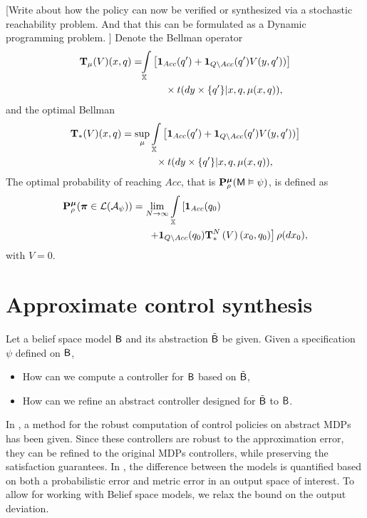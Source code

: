 \documentclass{ifacconf}
\newcommand{\red}[1]{{\color{red} #1}}
\begin{document}
\red{[Write about how the policy can now be verified or synthesized via a stochastic reachability problem. And that this can be formulated as a Dynamic programming problem.  ]}
Denote the Bellman operator
\begin{align}\label{eq:V_recopt_inf}
& \Bel_\pol (V)(x,q) =\!\!\int_{\bar\X}  \left[\mathbf 1_{Acc}(q')+  \mathbf 1_{Q\setminus Acc}( q')V( y, q'))\right]\notag\\&\hspace{3cm}\hfill 
\times \bar{\tr}(d y\times\{q'\}|x,q,\pol(x,q)),
\end{align}
and the optimal Bellman 
\begin{align}\label{eq:V_recopt_inf}
& \Bel_\ast (V)(x,q) =\sup_\pol\int_{\X}\left[\mathbf 1_{Acc}( q')+  \mathbf 1_{Q\setminus Acc}(q')V(y,q'))\right]\notag\\&\hspace{3cm}\hfill\times \bar{\tr}(d y\times\{q'\}|x,q,\pol(x,q)),
\end{align}
The optimal probability of reaching $Acc $, that is $\mathbf{P}_\rho^{\boldsymbol{\mu}}(\mathsf{M}\vDash\psi) $, is defined as
\begin{align*}
&\P_\init^\polb
(\word \in\mathcal L(\mathcal A_\psi))= 	\lim_{N\rightarrow \infty}\int_{\bar{\X}}\left[\mathbf 1_{Acc}( q_0)\right.\\ &\hspace{3cm} \left.+ \mathbf 1_{Q\setminus Acc}(q_0) \Bel^N_\ast\left( V\right)(x_0,q_0)\right] {\init} (d \bar x_0),
\end{align*}
with $V=0$.

\section{Approximate control synthesis}
 Let a belief space model $\mathsf{B}$ and its abstraction $\tilde {\mathsf{B}}$ be given.  Given a specification $\psi$ defined on $\mathsf{B}$,  \begin{itemize}
	\item How can we compute a controller for $\mathsf{B}$ based on $\tilde {\mathsf{B}}$,
	\item How can we refine an abstract controller designed for $\tilde{\mathsf{B}}$ to $\mathsf{B}$.
\end{itemize}

In \citet{tech_report_TACAS}, a method for the robust computation of control policies on abstract MDPs has been given.  Since these controllers are robust to the approximation error,  they can be refined to the original MDPs controllers, while preserving the satisfaction guarantees. 
In \citet{tech_report_TACAS}, the difference between the models is quantified based on both a probabilistic error and metric error in an output space of interest. 
To allow for working with Belief space models, we relax the bound on the output deviation.
\end{document}
